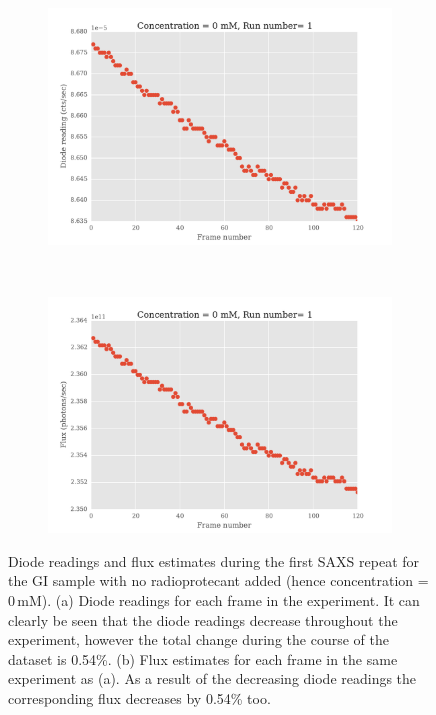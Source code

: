 \begin{figure}
    \centering
    \begin{subfigure}[b]{1.0\textwidth}
            \centering
            \includegraphics[width=\textwidth]{figures/saxs/np_diode_readings.pdf}
            \caption{}
            \label{fig:Diode readings}
    \end{subfigure}
    \\
    \begin{subfigure}[b]{1.0\textwidth}
            \centering
            \includegraphics[width=\textwidth]{figures/saxs/np_flux_estimates.pdf}
            \caption{}
            \label{fig:Flux estimates}
    \end{subfigure}
    \caption[Diode readings and flux estimates during the first SAXS repeat for the GI sample with no radioprotecant added.]{Diode readings and flux estimates during the first SAXS repeat for the GI sample with no radioprotecant added (hence concentration = 0\,mM).
    (a) Diode readings for each frame in the experiment.
    It can clearly be seen that the diode readings decrease throughout the experiment, however the total change during the course of the dataset is 0.54\%.
    (b) Flux estimates for each frame in the same experiment as (a).
    As a result of the decreasing diode readings the corresponding flux decreases by 0.54\% too.}
    \label{fig:Diode and flux readings}
\end{figure}
